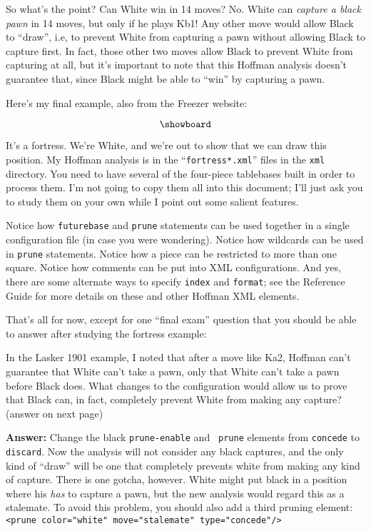 \documentclass[11pt]{article}
\begin{document}
So what's the point?  Can White win in 14 moves?  No.  White can {\it
capture a black pawn} in 14 moves, but only if he plays Kb1!  Any
other move would allow Black to ``draw'', i.e, to prevent White from
capturing a pawn without allowing Black to capture first.  In fact,
those other two moves allow Black to prevent White from capturing at
all, but it's important to note that this Hoffman analysis doesn't
guarantee that, since Black might be able to ``win'' by capturing a
pawn.

Here's my final example, also from the Freezer website:

$$\showboard$$

It's a fortress.  We're White, and we're out to show that we can draw
this position.  My Hoffman analysis is in the ``{\tt fortress*.xml}''
files in the {\tt xml} directory.  You need to have several of
the four-piece tablebases built in order to process them.  I'm not
going to copy them all into this document; I'll just ask you to study
them on your own while I point out some salient features.

Notice how {\tt futurebase} and {\tt prune} statements can be used
together in a single configuration file (in case you were wondering).
Notice how wildcards can be used in {\tt prune} statements.  Notice
how a piece can be restricted to more than one square.  Notice how
comments can be put into XML configurations.  And yes, there are some
alternate ways to specify {\tt index} and {\tt format}; see
the Reference Guide for more details on these and other
Hoffman XML elements.

That's all for now, except for one ``final exam'' question that you
should be able to answer after studying the fortress example:

In the Lasker 1901 example, I noted that after a move like Ka2,
Hoffman can't guarantee that White can't take a pawn, only that White
can't take a pawn before Black does.  What changes to the
configuration would allow us to prove that Black can, in fact,
completely prevent White from making any capture?  (answer on next
page)

\vfill\eject

{\bf Answer:} Change the black {\tt prune-enable} and {\tt
prune} elements from {\tt concede} to {\tt discard}.  Now the analysis
will not consider any black captures, and the only kind of ``draw''
will be one that completely prevents white from making any kind of
capture.  There is one gotcha, however.  White might put black in a
position where his {\it has} to capture a pawn, but the new analysis
would regard this as a stalemate.  To avoid this problem, you should
also add a third pruning element: {\tt <prune color="white"
move="stalemate" type="concede"/>}
\end{document}
